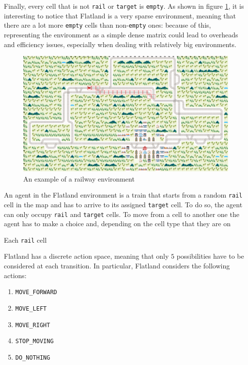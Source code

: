 \documentclass[a4paper,10pt]{report}
\begin{document}
Finally, every cell that is not \texttt{rail} or \texttt{target} is \texttt{empty}. As shown in figure \ref{fig:env-example}, it is interesting to notice that Flatland is a very sparse environment, meaning that there are a lot more \texttt{empty} cells than non-\texttt{empty} ones: because of this, representing the environment as a simple dense matrix could lead to overheads and efficiency issues, especially when dealing with relatively big environments.

\begin{figure}[h]
	\includegraphics[width=\textwidth]{env.png}
	\caption{An example of a railway environment}
	\label{fig:env-example}
\end{figure}

An agent in the Flatland environment is a train that starts from a random \texttt{rail} cell in the map and has to arrive to its assigned \texttt{target} cell. To do so, the agent can only occupy \texttt{rail} and \texttt{target} cells. To move from a cell to another one the agent has to make a choice and, depending on the cell type that they are on

Each \texttt{rail} cell 

Flatland has a discrete action space, meaning that only $5$ possibilities have to be considered at each transition. In particular, Flatland considers the following actions:
\begin{enumerate}
	\item \texttt{MOVE_FORWARD}
	\item \texttt{MOVE_LEFT}
	\item \texttt{MOVE_RIGHT}
	\item \texttt{STOP_MOVING}
	\item \texttt{DO_NOTHING}
\end{enumerate}
\end{document}
